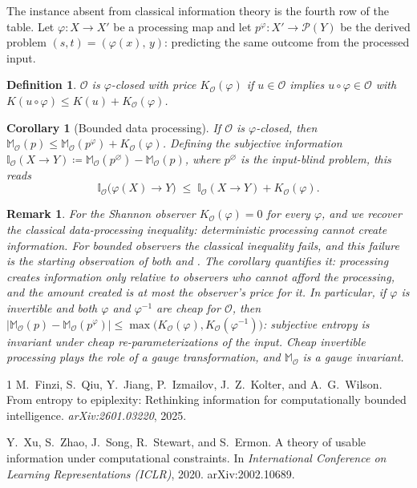 \documentclass[11pt]{article}
\newtheorem{definition}{Definition}
\newtheorem{corollary}{Corollary}
\newtheorem{remark}{Remark}
\begin{document}
The instance absent from classical information theory is the fourth row of the table. Let $\varphi: X \to X'$ be a processing map and let $p^\varphi: X' \to \mathcal P(Y)$ be the derived problem $(s,t) = (\varphi(x),\, y)$: predicting the same outcome from the processed input.

\begin{definition}
$\mathcal O$ is \emph{$\varphi$-closed with price $K_\mathcal{O}(\varphi)$} if $u \in \mathcal O$ implies $u \circ \varphi \in \mathcal O$ with $K(u \circ \varphi) \leq K(u) + K_\mathcal{O}(\varphi)$.
\end{definition}

\begin{corollary}[Bounded data processing]\label{cor:dpi}
If $\mathcal O$ is $\varphi$-closed, then $\mathbb M_\mathcal{O}(p) \leq \mathbb M_\mathcal{O}(p^\varphi) + K_\mathcal{O}(\varphi)$. Defining the subjective information $\mathbb I_\mathcal{O}(X \to Y) \coloneqq \mathbb M_\mathcal{O}(p^\varnothing) - \mathbb M_\mathcal{O}(p)$, where $p^\varnothing$ is the input-blind problem, this reads
\[ \mathbb I_\mathcal{O}\big(\varphi(X) \to Y\big) \;\leq\; \mathbb I_\mathcal{O}(X \to Y) + K_\mathcal{O}(\varphi). \]
\end{corollary}

\begin{remark}
For the Shannon observer $K_\mathcal{O}(\varphi) = 0$ for every $\varphi$, and we recover the classical data-processing inequality: deterministic processing cannot create information. For bounded observers the classical inequality fails, and this failure is the starting observation of both \cite{xu2020} and \cite{finzi2025}. The corollary quantifies it: \emph{processing creates information only relative to observers who cannot afford the processing, and the amount created is at most the observer's price for it.} In particular, if $\varphi$ is invertible and both $\varphi$ and $\varphi^{-1}$ are cheap for $\mathcal O$, then $|\mathbb M_\mathcal{O}(p) - \mathbb M_\mathcal{O}(p^\varphi)| \leq \max\big(K_\mathcal{O}(\varphi), K_\mathcal{O}(\varphi^{-1})\big)$: subjective entropy is invariant under cheap re-parameterizations of the input. Cheap invertible processing plays the role of a gauge transformation, and $\mathbb M_\mathcal{O}$ is a gauge invariant.
\end{remark}


\begin{thebibliography}{1}
M.~Finzi, S.~Qiu, Y.~Jiang, P.~Izmailov, J.~Z.~Kolter, and A.~G.~Wilson.
\newblock From entropy to epiplexity: Rethinking information for computationally bounded intelligence.
\newblock \emph{arXiv:2601.03220}, 2025.

Y.~Xu, S.~Zhao, J.~Song, R.~Stewart, and S.~Ermon.
\newblock A theory of usable information under computational constraints.
\newblock In \emph{International Conference on Learning Representations (ICLR)}, 2020. arXiv:2002.10689.
\end{thebibliography}
\end{document}
